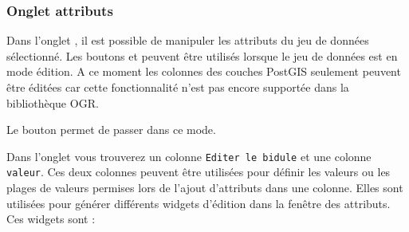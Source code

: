 \subsubsection{Onglet attributs}\label{label_attributes}
Dans l'onglet , il est possible de manipuler les attributs du jeu de donn\'ees s\'electionn\'e. Les boutons  et  peuvent \^etre utilis\'es lorsque le jeu de donn\'ees est en mode \'edition. A ce moment les colonnes des couches PostGIS seulement peuvent \^etre \'edit\'ees car cette fonctionnalit\'e n'est pas encore support\'ee dans la biblioth\`eque OGR.

Le bouton  permet de passer dans ce mode.


Dans l'onglet  vous trouverez un colonne \texttt{Editer le bidule} et une colonne \texttt{valeur}. Ces deux colonnes peuvent \^etre utilis\'ees pour d\'efinir les valeurs ou les plages de valeurs permises lors de l'ajout d'attributs dans une colonne. Elles sont utilis\'ees pour g\'en\'erer diff\'erents widgets d'\'edition dans la fen\^etre des attributs. Ces widgets sont :

